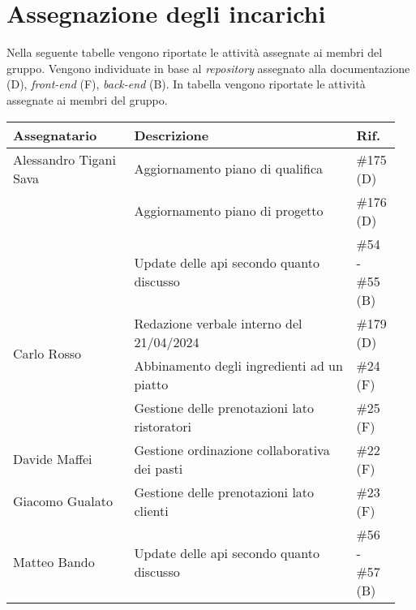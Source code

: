 \section{Assegnazione degli incarichi}
Nella seguente tabelle vengono riportate le attività assegnate ai membri del 
gruppo. Vengono individuate in base al \textit{repository} assegnato alla 
documentazione (D), \textit{front-end} (F), \textit{back-end} (B).
In tabella vengono riportate le attività assegnate ai membri del gruppo.
\begin{center}
	{
		\renewcommand{\arraystretch}{1.5}
		\begin{tabular}{p{0.30\linewidth}|p{0.55\linewidth}|p{0.10\linewidth}}
			\textbf{Assegnatario}			& \textbf{Descrizione}							& \textbf{Rif.} \\
			\hline
			Alessandro Tigani Sava			& Aggiornamento piano di qualifica				& \#175 (D)	\\
			\cline{2-3} 
											& Aggiornamento piano di progetto				& \#176 (D)	\\
			\cline{2-3}
											& Update delle api secondo quanto discusso		& \#54 - \#55 (B)	\\
			\hline
			\multirow{2}{*}{Carlo Rosso}	& Redazione verbale interno del 21/04/2024		& \#179 (D)	\\
			\cline{2-3} 
											& Abbinamento degli ingredienti ad un piatto	& \#24 (F)	\\
			\cline{2-3}
											& Gestione delle prenotazioni lato ristoratori	& \#25 (F)	\\
			\hline
			Davide Maffei					& Gestione ordinazione collaborativa dei pasti	& \#22 (F)	\\
			\hline
			Giacomo Gualato					& Gestione delle prenotazioni lato clienti		& \#23 (F)	\\
			\hline
			Matteo Bando                 	& Update delle api secondo quanto discusso      & \#56 - \#57 (B)	\\
			\hline
		\end{tabular}
	}
\end{center}

